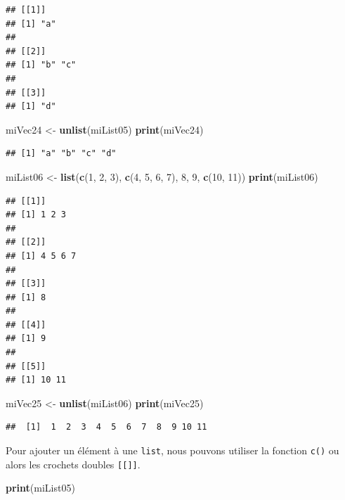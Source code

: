 \documentclass[twoside,symmetric]{book}
\newenvironment{Shaded}{}{}
\newcommand{\DecValTok}[1]{#1}
\newcommand{\KeywordTok}[1]{\textbf{#1}}
\newcommand{\NormalTok}[1]{#1}
\newcommand{\StringTok}[1]{#1}
\begin{document}
\begin{verbatim}
## [[1]]
## [1] "a"
## 
## [[2]]
## [1] "b" "c"
## 
## [[3]]
## [1] "d"
\end{verbatim}

\begin{Shaded}
\begin{Highlighting}[]
\NormalTok{miVec24 <-}\StringTok{ }\KeywordTok{unlist}\NormalTok{(miList05)}
\KeywordTok{print}\NormalTok{(miVec24)}
\end{Highlighting}
\end{Shaded}

\begin{verbatim}
## [1] "a" "b" "c" "d"
\end{verbatim}

\begin{Shaded}
\begin{Highlighting}[]
\NormalTok{miList06 <-}\StringTok{ }\KeywordTok{list}\NormalTok{(}\KeywordTok{c}\NormalTok{(}\DecValTok{1}\NormalTok{, }\DecValTok{2}\NormalTok{, }\DecValTok{3}\NormalTok{), }\KeywordTok{c}\NormalTok{(}\DecValTok{4}\NormalTok{, }\DecValTok{5}\NormalTok{, }\DecValTok{6}\NormalTok{, }\DecValTok{7}\NormalTok{), }\DecValTok{8}\NormalTok{, }\DecValTok{9}\NormalTok{, }\KeywordTok{c}\NormalTok{(}\DecValTok{10}\NormalTok{, }\DecValTok{11}\NormalTok{))}
\KeywordTok{print}\NormalTok{(miList06)}
\end{Highlighting}
\end{Shaded}

\begin{verbatim}
## [[1]]
## [1] 1 2 3
## 
## [[2]]
## [1] 4 5 6 7
## 
## [[3]]
## [1] 8
## 
## [[4]]
## [1] 9
## 
## [[5]]
## [1] 10 11
\end{verbatim}

\begin{Shaded}
\begin{Highlighting}[]
\NormalTok{miVec25 <-}\StringTok{ }\KeywordTok{unlist}\NormalTok{(miList06)}
\KeywordTok{print}\NormalTok{(miVec25)}
\end{Highlighting}
\end{Shaded}

\begin{verbatim}
##  [1]  1  2  3  4  5  6  7  8  9 10 11
\end{verbatim}

Pour ajouter un élément à une \texttt{list}, nous pouvons utiliser la fonction \texttt{c()} ou alors les crochets doubles \texttt{{[}{[}{]}{]}}.

\begin{Shaded}
\begin{Highlighting}[]
\KeywordTok{print}\NormalTok{(miList05)}
\end{Highlighting}
\end{Shaded}
\end{document}
